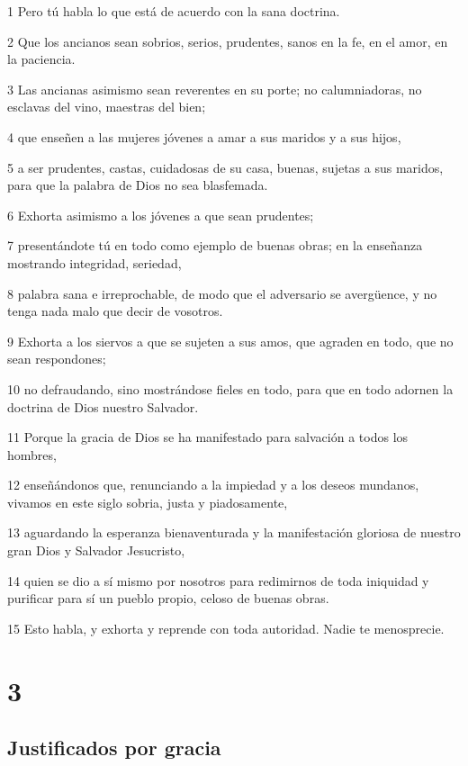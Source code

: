 \par 1 Pero tú habla lo que está de acuerdo con la sana doctrina.
\par 2 Que los ancianos sean sobrios, serios, prudentes, sanos en la fe, en el amor, en la paciencia.
\par 3 Las ancianas asimismo sean reverentes en su porte; no calumniadoras, no esclavas del vino, maestras del bien;
\par 4 que enseñen a las mujeres jóvenes a amar a sus maridos y a sus hijos,
\par 5 a ser prudentes, castas, cuidadosas de su casa, buenas, sujetas a sus maridos, para que la palabra de Dios no sea blasfemada.
\par 6 Exhorta asimismo a los jóvenes a que sean prudentes;
\par 7 presentándote tú en todo como ejemplo de buenas obras; en la enseñanza mostrando integridad, seriedad,
\par 8 palabra sana e irreprochable, de modo que el adversario se avergüence, y no tenga nada malo que decir de vosotros.
\par 9 Exhorta a los siervos a que se sujeten a sus amos, que agraden en todo, que no sean respondones;
\par 10 no defraudando, sino mostrándose fieles en todo, para que en todo adornen la doctrina de Dios nuestro Salvador.
\par 11 Porque la gracia de Dios se ha manifestado para salvación a todos los hombres,
\par 12 enseñándonos que, renunciando a la impiedad y a los deseos mundanos, vivamos en este siglo sobria, justa y piadosamente,
\par 13 aguardando la esperanza bienaventurada y la manifestación gloriosa de nuestro gran Dios y Salvador Jesucristo,
\par 14 quien se dio a sí mismo por nosotros para redimirnos de toda iniquidad y purificar para sí un pueblo propio, celoso de buenas obras.
\par 15 Esto habla, y exhorta y reprende con toda autoridad. Nadie te menosprecie.

\chapter{3}

\section*{Justificados por gracia}

